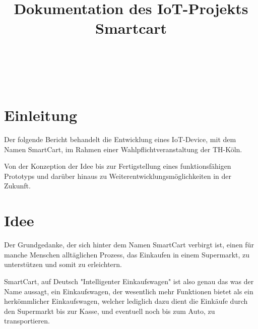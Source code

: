 \documentclass{sigchi}
\def\plaintitle{Dokumentation des IoT-Projekts Smartcart}
\begin{document}
\title{\plaintitle}

\author{%
  \\
  \\
  \\
}

\maketitle

\setcounter{page}{1}


\section{Einleitung}
Der folgende Bericht behandelt die Entwicklung eines IoT-Device, mit dem Namen SmartCart, im Rahmen einer Wahlpflichtveranstaltung der TH-Köln. 

Von der Konzeption der Idee bis zur Fertigstellung eines funktionsfähigen Prototyps und darüber hinaus zu Weiterentwicklungsmöglichkeiten in der Zukunft.  


\section{Idee}

Der Grundgedanke, der sich hinter dem Namen SmartCart verbirgt ist, einen für manche Menschen alltäglichen Prozess, das Einkaufen in einem Supermarkt, zu unterstützen und somit zu erleichtern. 

SmartCart, auf Deutsch "Intelligenter Einkaufswagen" ist also genau das was der Name aussagt, ein Einkaufswagen, der wesentlich mehr Funktionen bietet als ein herkömmlicher Einkaufswagen, welcher lediglich dazu dient die Einkäufe durch den Supermarkt bis zur Kasse, und eventuell noch bis zum Auto, zu transportieren. 
\end{document}
